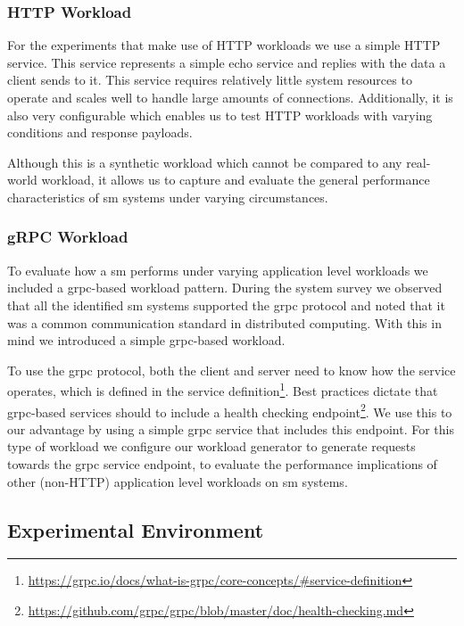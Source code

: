 \subsubsection{HTTP Workload}
\label{sec:experiments:design:workloads:http}

For the experiments that make use of HTTP workloads we use a simple HTTP service. This service represents a simple echo service and replies with the data a client sends to it. This service requires relatively little system resources to operate and scales well to handle large amounts of connections. Additionally, it is also very configurable which enables us to test HTTP workloads with varying conditions and response payloads.

Although this is a synthetic workload which cannot be compared to any real-world workload, it allows us to capture and evaluate the general performance characteristics of \gls{sm} systems under varying circumstances.

\subsubsection{gRPC Workload}
\label{sec:experiments:design:workloads:grpc}

To evaluate how a \gls{sm} performs under varying application level workloads we included a \gls{grpc}-based workload pattern. During the system survey we observed that all the identified \gls{sm} systems supported the \gls{grpc} protocol and noted that it was a common communication standard in distributed computing. With this in mind we introduced a simple \gls{grpc}-based workload. 

To use the \gls{grpc} protocol, both the client and server need to know how the service operates, which is defined in the service definition\footnote{\url{https://grpc.io/docs/what-is-grpc/core-concepts/\#service-definition}}. Best practices dictate that \gls{grpc}-based services should to include a health checking endpoint\footnote{\url{https://github.com/grpc/grpc/blob/master/doc/health-checking.md}}. We use this to our advantage by using a simple \gls{grpc} service that includes this endpoint. For this type of workload we configure our workload generator to generate requests towards the \gls{grpc} service endpoint, to evaluate the performance implications of other (non-HTTP) application level workloads on \gls{sm} systems.

\subsection{Experimental Environment}
\label{sec:experiments:design:environment}

